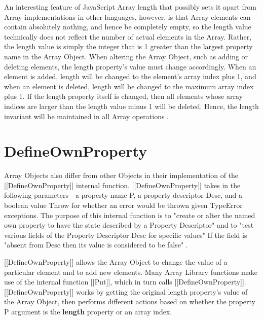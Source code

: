 \documentclass[a4paper,11pt,twoside]{report}
\begin{document}
An interesting feature of JavaScript Array length that possibly sets it apart from Array implementations in other languages, however, is that Array elements can contain absolutely nothing, and hence be completely empty, so the length value technically does not reflect the number of actual elements in the Array. Rather, the length value is simply the integer that is 1 greater than the largest property name in the Array Object. When altering the Array Object, such as adding or deleting elements, the length property's value must change accordingly. When an element is added, length will be changed to the element's array index plus 1, and when an element is deleted, length will be changed to the maximum array index plus 1. If the length property itself is changed, then all elements whose array indices are larger than the length value minus 1 will be deleted. Hence, the length invariant will be maintained in all Array operations \cite{EcmaScript}.

\section{DefineOwnProperty}
Array Objects also differ from other Objects in their implementation of the [[DefineOwnProperty]] internal function. [[DefineOwnProperty]] takes in the following parameters - a property name P, a property descriptor Desc, and a boolean value Throw for whether an error would be thrown given TypeError exceptions. The purpose of this internal function is to "create or alter the named own property to have the state described by a Property Descriptor" and to "test various fields of the Property Descriptor Desc for specific values" If the field is "absent from Desc then its value is considered to be false" \cite{EcmaScript}. 

[[DefineOwnProperty]] allows the Array Object to change the value of a particular element and to add new elements. Many Array Library functions make use of the internal function [[Put]], which in turn calls [[DefineOwnProperty]]. [[DefineOwnProperty]] works by getting the original length property's value of the Array Object, then performs different actions based on whether the property P argument is the \textbf{length} property or an array index. 
\end{document}
